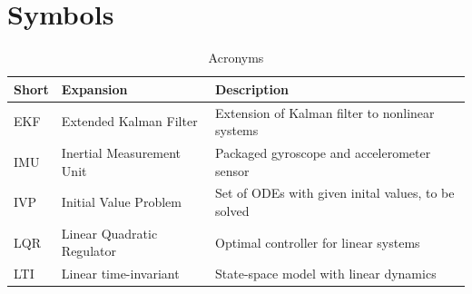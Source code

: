 \section{Symbols}
\begin{table}[ht]
\begin{center}
\begin{tabular}{l l l}
Short & Expansion  & Description \\
\hline
EKF & Extended Kalman Filter & Extension of Kalman filter to nonlinear systems \\
IMU & Inertial Measurement Unit & Packaged gyroscope and accelerometer sensor \\
IVP & Initial Value Problem & Set of ODEs with given inital values, to be solved \\
LQR & Linear Quadratic Regulator & Optimal controller for linear systems \\
LTI & Linear time-invariant & State-space model with linear dynamics
\end{tabular}
\end{center}
\caption{Acronyms} \label{tab:acronyms}
\end{table}


